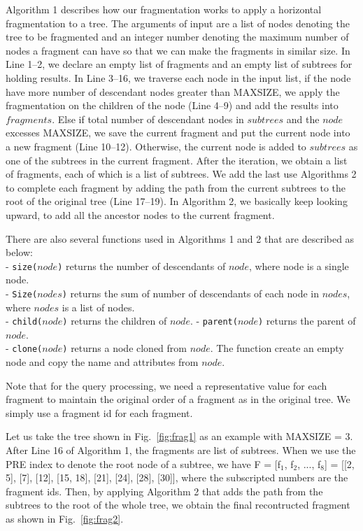 Algorithm 1 describes how our fragmentation works to apply a horizontal
fragmentation to a tree. The arguments of input are a list of nodes denoting the
tree to be fragmented and an integer number denoting the maximum number of nodes
a fragment can have so that we can make the fragments in similar size.   In Line
1--2, we declare an empty list of fragments and an empty list of subtrees for
holding results. In Line 3--16, we traverse each node in the input list, if the
node have more number of descendant nodes greater than MAXSIZE, we apply the
fragmentation on the children of the node (Line 4--9) and add the results into
$fragments$. Else if total number of descendant nodes in $subtrees$ and the
$node$ excesses MAXSIZE, we save the current fragment and put the current node
into a new fragment (Line 10--12). Otherwise, the current node is added to
$subtrees$ as one of the subtrees in the current fragment. After the iteration,
we obtain a list of fragments, each of which is a list of subtrees. We add the
last use Algorithms 2 to complete each fragment by adding the path from the
current subtrees to the root of the original tree (Line 17--19). In Algorithm 2,
we basically keep looking upward, to add all the ancestor nodes to the current
fragment.

There are also several functions used in Algorithms 1 and 2 that are described 
as below:\\
- \texttt{size($node$)} returns the number of descendants of $node$, where node
is a single node.\\
- \texttt{Size($nodes$)} returns the sum of number of descendants of each node
in $nodes$, where $nodes$ is a list of nodes.\\
- \texttt{child($node$)} returns the children of $node$.
- \texttt{parent($node$)} returns the parent of $node$.\\
- \texttt{clone($node$)} returns a node cloned from $node$. The function create
an empty node and copy the name and attributes from $node$.

Note that for the query processing, we need a representative value for each
fragment to maintain the original order of a fragment as in the original tree.
We simply use a fragment id for each fragment.

Let us take the tree shown in Fig.~\ref{fig:frag1} as an example with MAXSIZE =
3. After Line 16 of Algorithm 1, the fragments are list of subtrees. When we use
the PRE index to denote the root node of a subtree, we have F = [f$_1$, f$_2$, ...,
f$_8$] = [[2, 5], [7], [12], [15, 18], [21], [24], [28], [30]], where the
subscripted numbers are the fragment ids. Then, by applying Algorithm 2 that adds
the path from the subtrees to the root of the whole tree, we obtain the final
recontructed fragment as shown in Fig.~\ref{fig:frag2}.


